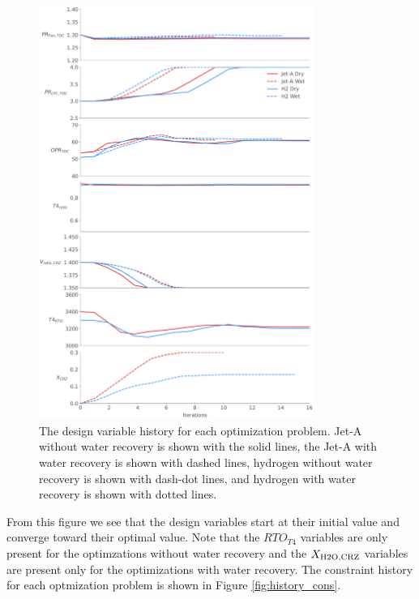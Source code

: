 \documentclass[conf]{new-aiaa}
\begin{document}
\begin{figure}[hbt!]
    \centering
    \includegraphics[width=0.8\textwidth]{dvs.pdf}
    \caption{The design variable history for each optimization problem.
        Jet-A without water recovery is shown with the solid lines, the Jet-A with water recovery is shown with dashed lines, hydrogen without water recovery is shown with dash-dot lines, and hydrogen with water recovery is shown with dotted lines.}
    \label{fig:history_dvs}
\end{figure}

From this figure we see that the design variables start at their initial value and converge toward their optimal value.
Note that the $RTO_{T4}$ variables are only present for the optimzations without water recovery and the $X_{\rm{H2O,CRZ}}$ variables are present only for the optimizations with water recovery.
The constraint history for each optmization problem is shown in Figure \ref{fig:history_cons}.
\end{document}
